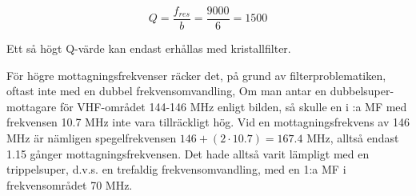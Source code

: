 \[ Q = \frac{f_{res}}{b} = \frac{9000}{6} = 1500 \]

Ett så högt Q-värde kan endast erhållas med kristallfilter.

För högre mottagningsfrekvenser räcker det, på grund av
filterproblematiken, oftast inte med en dubbel frekvensomvandling, Om
man antar en dubbelsuper-mottagare för VHF-området 144-146 MHz enligt
bilden, så skulle en i :a MF med frekvensen 10.7 MHz inte vara
tillräckligt hög. Vid en mottagningsfrekvens av 146 MHz är nämligen
spegelfrekvensen \(146 + (2 \cdot 10.7) = 167.4\) MHz, alltså endast
1.15 gånger mottagningsfrekvensen. Det hade alltså varit lämpligt med
en trippelsuper, d.v.s. en trefaldig frekvensomvandling, med en 1:a
MF i frekvensområdet 70 MHz.
